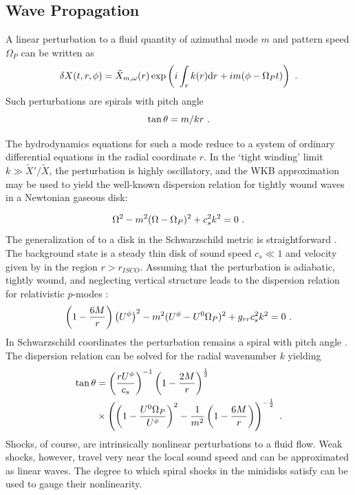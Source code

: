 \subsection{Wave Propagation}

A linear perturbation to a fluid quantity of azimuthal mode $m$ and pattern speed $\Omega_P$ can be written as
\begin{equation}
	\delta X(t, r, \phi) = \tilde{X}_{m,\omega}(r) \exp \left( i \int_r k(r) \dd r  + i m (\phi - \Omega_P t) \right)\ . \eqlabel{pert}
\end{equation}
Such perturbations are spirals with pitch angle
\begin{equation}
	\tan \theta = m / k r \ . \eqlabel{pitch}
\end{equation}

The hydrodynamics equations for such a mode reduce to a system of ordinary differential equations in the radial coordinate $r$.  In the `tight winding' limit $k \gg \tilde{X}'/\tilde{X}$, the perturbation is highly oscillatory, and the WKB approximation may be used to yield the well-known \citep{Binney08} dispersion relation for tightly wound waves in a Newtonian gaseous disk:

\begin{equation}
	\Omega^2 - m^2(\Omega-\Omega_P)^2 + c_s^2 k^2 = 0 \ . \eqlabel{dispNewt}
\end{equation}
The generalization of  to a disk in the Schwarzschild metric is straightforward \citep{Perez97}.  The background state is a steady thin disk of sound speed $c_s \ll 1$ and velocity given by  in the region $r > r_{ISCO}$.  Assuming that the perturbation is adiabatic, tightly wound, and neglecting vertical structure leads to the dispersion relation for relativistic $p$-modes \citep{Abramowicz13}:
\begin{equation}
	\left(1-\frac{6M}{r} \right)\left(U^\phi\right)^2 - m^2(U^\phi-U^0\Omega_P)^2 + g_{rr} c_s^2 k^2 = 0 \ . \eqlabel{disprel}
\end{equation}
In Schwarzschild coordinates the perturbation remains a spiral with pitch angle .  The dispersion relation can be solved for the radial wavenumber $k$ yielding
\begin{align}
	\tan \theta &= \left( \frac{r U^\phi}{c_s} \right)^{-1} \left(1-\frac{2M}{r}\right)^{\frac{1}{2}} \eqlabel{dispRelPitch} \\ \nonumber
		&\times \left(\left(1- \frac{U^0 \Omega_P}{U^\phi}\right)^2 - \frac{1}{m^2}\left(1-\frac{6M}{r}\right)\right)^{-\frac{1}{2}}\ . 
\end{align}
Shocks, of course, are intrinsically nonlinear perturbations to a fluid flow.  Weak shocks, however, travel very near the local sound speed and can be approximated as linear waves.  The degree to which spiral shocks in the minidisks satisfy  can be used to gauge their nonlinearity.  

